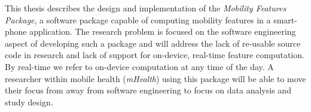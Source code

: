 This thesis describes the design and implementation of the \textit{Mobility Features Package}, a software package capable of computing mobility features in a smart-phone application. The research problem is focused on the software engineering aspect of developing such a package and will address the lack of re-usable source code in research and lack of support for on-device, real-time feature computation. By real-time we refer to on-device computation at any time of the day. A researcher within mobile health (\textit{mHealth}) using this package will be able to move their focus from away from software engineering to focus on data analysis and study design.
